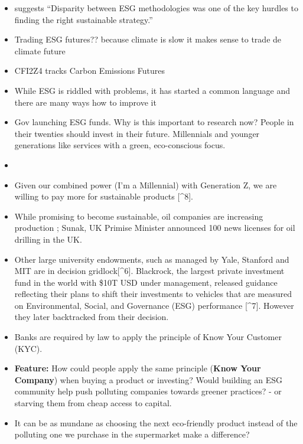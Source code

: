 \documentclass[
  letterpaper,
  DIV=11,
  numbers=noendperiod]{scrartcl}
\begin{document}
\begin{itemize}
\item
  \citet{margarytakirakosianMethodologiesAreAll2022} suggests
  ``Disparity between ESG methodologies was one of the key hurdles to
  finding the right sustainable strategy.''
\item
  Trading ESG futures?? because climate is slow it makes sense to trade
  de climate future
\item
  CFI2Z4 tracks Carbon Emissions Futures
  \citep{investing.comCarbonEmissionsFutures2024}
\item
  While ESG is riddled with problems, it has started a common language
  and there are many ways how to improve it
\item
  Gov launching ESG funds. Why is this important to research now? People
  in their twenties should invest in their future. Millennials and
  younger generations like services with a green, eco-conscious focus.
\item
  \citet{ESGLangChaoFanSiYiJianJianTanBiaoXianYouYi2022}
\item
  Given our combined power (I'm a Millennial) with Generation Z, we are
  willing to pay more for sustainable products {[}\^{}8{]}.
\item
  While promising to become sustainable, oil companies are increasing
  production \citet{noorBigOilQuietly2023}; Sunak, UK Primise Minister
  announced 100 news licenses for oil drilling in the UK.
\item
  Other large university endowments, such as managed by Yale, Stanford
  and MIT are in decision gridlock{[}\^{}6{]}. Blackrock, the largest
  private investment fund in the world with \$10T USD under management,
  released guidance reflecting their plans to shift their investments to
  vehicles that are measured on Environmental, Social, and Governance
  (ESG) performance {[}\^{}7{]}. However they later backtracked from
  their decision.
\item
  Banks are required by law to apply the principle of Know Your Customer
  (KYC).
\item
  \textbf{Feature:} How could people apply the same principle
  (\textbf{Know Your Company}) when buying a product or investing? Would
  building an ESG community help push polluting companies towards
  greener practices? - or starving them from cheap access to capital.
\item
  It can be as mundane as choosing the next eco-friendly product instead
  of the polluting one we purchase in the supermarket make a difference?

\end{itemize}
\end{document}
